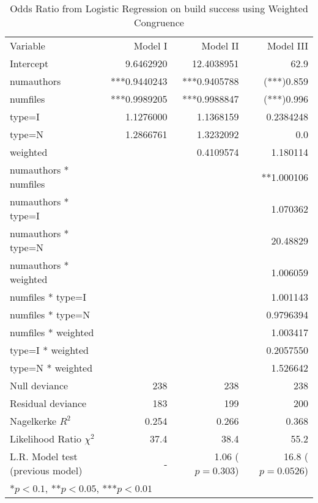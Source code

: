 \begin{table*}
\begin{center}
\begin{tabular}{lrrr}
  \hline
Variable              & Model I   & Model II   & Model III  \\
Intercept             & 9.6462920 & 12.4038951 & 62.9       \\
numauthors            & ***0.9440243 & ***0.9405788 &  (***)0.859     \\
numfiles              & ***0.9989205 & ***0.9988847 &  (***)0.996     \\
type=I                & 1.1276000 &  1.1368159 &  0.2384248 \\
type=N                & 1.2866761 &  1.3232092 & 0.0       \\
weighted              &           &  0.4109574 &  1.180114  \\
numauthors * numfiles &           &            &  **1.000106  \\
numauthors * type=I   &           &            &  1.070362  \\
numauthors * type=N   &           &            &  20.48829  \\
numauthors * weighted &           &            &  1.006059  \\
numfiles * type=I     &           &            &  1.001143  \\
numfiles * type=N     &           &            & 0.9796394  \\
numfiles * weighted   &           &            &  1.003417  \\
type=I * weighted     &           &            & 0.2057550  \\
type=N * weighted     &           &            &  1.526642  \\
	\hline
Null deviance             & 238  & 238  & 238 \\
Residual deviance         & 183  & 199  & 200 \\
Nagelkerke $R^2$          & 0.254 & 0.266 & 0.368 \\ 
Likelihood Ratio $\chi^2$ & 37.4 & 38.4 & 55.2 \\
L.R. Model test (previous model) & -    & 1.06 ($p = 0.303$) & 16.8 ($p = 0.0526$) \\

	\hline
\multicolumn{4}{l}{*$p < 0.1$, **$p < 0.05$, ***$p < 0.01$ }
\end{tabular}
\end{center}
\label{tab:oddsratio_weighted}
\caption{Odds Ratio from Logistic Regression on build success using Weighted Congruence}
\end{table*}
